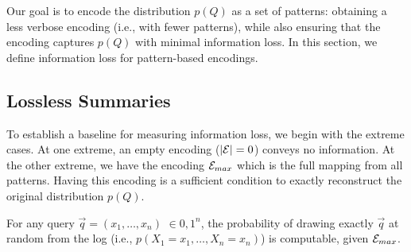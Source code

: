 

Our goal is to encode the distribution $p(Q)$ as a set of patterns: obtaining a less verbose encoding (i.e., with fewer patterns), while also ensuring that the encoding captures $p(Q)$ with minimal information loss.
In this section, we define information loss for pattern-based encodings.

\subsection{Lossless Summaries}
\label{sec:representativeness:idealdef}
To establish a baseline for measuring information loss, we begin with the extreme cases.
At one extreme, an empty encoding ($|\mathcal E| = 0$) conveys no information.
At the other extreme, we have the encoding $\mathcal E_{max}$ which is the full mapping from all patterns. 
Having this encoding is a sufficient condition to exactly reconstruct the original distribution $p(Q)$. 
\vspace*{-4mm}
\begin{proposition}
\label{PROPOSITION:LOSSLESSSUMMARY} 
For any query $\vec{q}=(x_1,\ldots,x_n)$ $\in{0,1}^n$,
the probability of drawing exactly $\vec{q}$ at random from the log (i.e., $p(X_1=x_1,\ldots,X_n=x_n)$) is computable, given $\mathcal E_{max}$.
\end{proposition}


